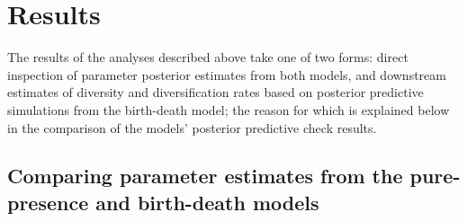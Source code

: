 \documentclass[12pt,letterpaper]{article}
\begin{document}
\section*{Results}

The results of the analyses described above take one of two forms: direct inspection of parameter posterior estimates from both models, and downstream estimates of diversity and diversification rates based on posterior predictive simulations from the birth-death model; the reason for which is explained below in the comparison of the models' posterior predictive check results.

\subsection*{Comparing parameter estimates from the pure-presence and birth-death models}

\end{document}
